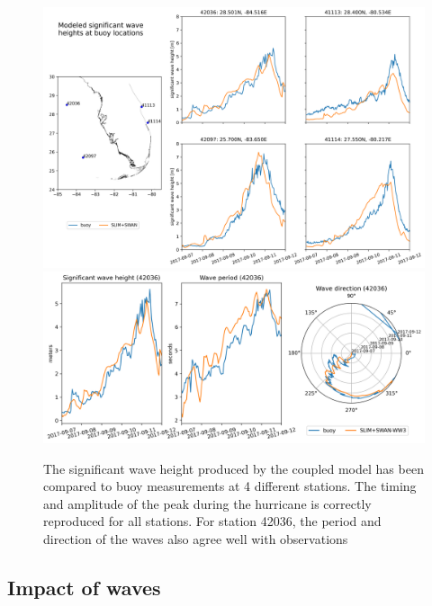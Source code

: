 \documentclass[11pt,a4paper]{article}
\begin{document}
\begin{figure}
    \centering
    \includegraphics[width=.95\textwidth]{fig/hsig_with_map_ww3.png}
    \includegraphics[width=.95\textwidth]{fig/val_waves.png}
    \caption{The significant wave height produced by the coupled model has been compared to buoy measurements at 4 different stations. The timing and amplitude of the peak during the hurricane is correctly reproduced for all stations. For station 42036, the period and direction of the waves also agree well with observations}
    \label{fig:waves}
\end{figure}

\subsection{Impact of waves}
\end{document}
